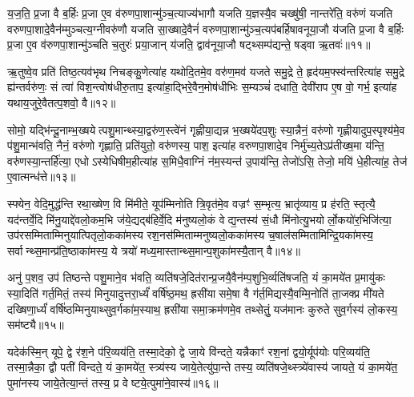 य॒ज॒ति॒ प्र॒जा वै ब॒र्\mbox{}हिः प्र॒जा ए॒व व॑रुणपा॒शान्मु॑ञ्च॒त्याज्य॑भागौ यजति य॒ज्ञस्यै॒व चख्षु॑षी॒ नान्तरे॑ति॒ वरु॑णं यजति वरुणपा॒शादे॒वैन॑म्मुञ्चत्य॒ग्नीवरु॑णौ यजति सा॒ख्षादे॒वैनं॑ वरुणपा॒शान्मु॑ञ्च॒त्यप॑बर्\mbox{}हिषावनूया॒जौ य॑जति प्र॒जा वै ब॒र्\mbox{}हिः प्र॒जा ए॒व व॑रुणपा॒शान्मु॑ञ्चति च॒तुरः॑ प्रया॒जान् य॑जति॒ द्वाव॑नूया॒जौ षट्थ्सम्प॑द्यन्ते॒ षड्वा ऋ॒तवः॑॥११॥

ऋ॒तुष्वे॒व प्रति॑ तिष्ठ॒त्यव॑भृथ निचङ्कु॒णेत्या॑ह यथोदि॒तमे॒व वरु॑ण॒मव॑ यजते समु॒द्रे ते॒ हृद॑यम॒फ्स्व॑न्तरित्या॑ह समु॒द्रे ह्य॑न्तर्वरु॑णः॒ सं त्वा॑ विश॒न्त्वोष॑धीरु॒ताप॒ इत्या॑हा॒द्भिरे॒वैन॒मोष॑धीभिः स॒म्यञ्चं॑ दधाति॒ देवी॑राप ए॒ष वो॒ गर्भ॒ इत्या॑ह यथाय॒जुरे॒वैतत्प॒शवो॒ वै॥१२॥

सोमो॒ यद्भि॑न्दू॒नाम्भ॒ख्षयेत्पशु॒मान्थ्स्या॒द्वरु॑ण॒स्त्वे॑नं गृह्णीया॒द्यन्न भ॒ख्षये॑दप॒शुः स्या॒न्नैनं॒ वरु॑णो गृह्णीयादुप॒स्पृश्य॑मे॒व प॑शु॒मान्भ॑वति॒ नैनं॒ वरु॑णो गृह्णाति॒ प्रति॑युतो॒ वरु॑णस्य॒ पाश॒ इत्या॑ह वरुणपा॒शादे॒व निर्मु॑च्य॒तेऽप्र॑तीख्ष॒मा य॑न्ति॒ वरु॑णस्या॒न्तर्\mbox{}हि॑त्या॒ एधोऽस्येधिषीम॒हीत्या॑ह स॒मिधै॒वाग्निं न॑म॒स्यन्त॑ उ॒पाय॑न्ति॒ तेजो॑ऽसि॒ तेजो॒ मयि॑ धे॒हीत्या॑ह॒ तेज॑ ए॒वात्मन्ध॑त्ते॥१३॥

{\anuvakamend[{रख्षाꣳ॑सि प्रया॒जानृ॒तवो॒ वै न॑म॒स्यन्तो॒ द्वाद॑श च॥३॥}]}

स्फ्येन॒ वेदि॒मुद्ध॑न्ति रथा॒ख्षेण॒ वि मि॑मीते॒ यूप॑म्मिनोति त्रि॒वृत॑मे॒व वज्रꣳ॑ स॒म्भृत्य॒ भ्रातृ॑व्याय॒ प्र ह॑रति॒ स्तृत्यै॒ यद॑न्तर्वे॒दि मि॑नु॒याद्दे॑वलो॒कम॒भि ज॑ये॒द्यद्ब॑हिर्वे॒दि म॑नुष्यलो॒कं वेद्य॒न्तस्य॑ सं॒धौ मि॑नोत्यु॒भयोर्लो॒कयो॑र॒भिजि॑त्या॒ उप॑रसम्मिताम्मिनुयात्पितृलो॒कका॑मस्य रश॒नस॑म्मिताम्मनुष्यलो॒कका॑मस्य च॒षाल॑सम्मितामिन्द्रि॒यका॑मस्य॒ सर्वान्थ्स॒मान्प्र॑ति॒ष्ठाका॑मस्य॒ ये त्रयो॑ मध्य॒मास्तान्थ्स॒मान्प॒शुका॑मस्यै॒तान् वै॥१४॥

अनु॑ प॒शव॒ उप॑ तिष्ठन्ते पशु॒माने॒व भ॑वति॒ व्यति॑षजे॒दित॑रान्प्र॒जयै॒वैन॑म्प॒शुभि॒र्व्यति॑षजति॒ यं का॒मये॑त प्र॒मायु॑कः स्या॒दिति॑ गर्त॒मितं॒ तस्य॑ मिनुयादुत्तरा॒र्ध्यं॑ वर्\mbox{}षि॑ष्ठ॒मथ॒ ह्रसी॑यासमे॒षा वै ग॑र्त॒मिद्यस्यै॒वम्मि॒नोति॑ ता॒जक्प्र मी॑यते दख्षिणा॒र्ध्यं॑ वर्\mbox{}षि॑ष्ठम्मिनुयाथ्सुव॒र्गका॑म॒स्याथ॒ ह्रसी॑यासमा॒क्रम॑णमे॒व तथ्सेतुं॒ यज॑मानः कुरुते सुव॒र्गस्य॑ लो॒कस्य॒ सम॑ष्ट्यै॥१५॥

यदेक॑स्मि॒न् यूपे॒ द्वे र॑श॒ने प॑रि॒व्यय॑ति॒ तस्मा॒देको॒ द्वे जा॒ये वि॑न्दते॒ यन्नैकाꣳ॑ रश॒नां द्वयो॒र्यूप॑योः परि॒व्यय॑ति॒ तस्मा॒न्नैका॒ द्वौ पती॑ विन्दते॒ यं का॒मये॑त॒ स्त्र्य॑स्य जाये॒तेत्यु॑पा॒न्ते तस्य॒ व्यति॑षजे॒थ्स्त्र्ये॑वास्य॑ जायते॒ यं का॒मये॑त॒ पुमा॑नस्य जाये॒तेत्या॒न्तं तस्य॒ प्र वेष्टये॒त्पुमा॑ने॒वास्य॑॥१६॥

